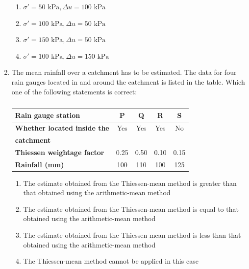 \documentclass[journal,12pt,onecolumn]{article}
\theoremstyle{remark}
\begin{document}
\begin{enumerate}
\hfill{}
\begin{enumerate}
    \item $\sigma' = 50 \text{ kPa}, \Delta u = 100 \text{ kPa}$
    \item $\sigma' = 100 \text{ kPa}, \Delta u = 50 \text{ kPa}$
    \item $\sigma' = 150 \text{ kPa}, \Delta u = 50 \text{ kPa}$
    \item $\sigma' = 100 \text{ kPa}, \Delta u = 150 \text{ kPa}$
\end{enumerate}

\item The mean rainfall over a catchment has to be estimated. The data for four rain gauges located in and around the catchment is listed in the table. Which one of the following statements is correct:
\begin{table}[H]
    \centering
    \begin{tabular}{|l|c|c|c|c|}
        \hline
        \textbf{Rain gauge station} & P & Q & R & S \\
        \hline
        \textbf{Whether located inside the} & Yes & Yes & Yes & No \\
        \textbf{catchment} & & & & \\
        \hline
        \textbf{Thiessen weightage factor} & 0.25 & 0.50 & 0.10 & 0.15 \\
        \hline
        \textbf{Rainfall (mm)} & 100 & 110 & 100 & 125 \\
        \hline
    \end{tabular}
    \caption{}
    \label{tab:q39}
\end{table}

\hfill{}
\begin{enumerate}
    \item The estimate obtained from the Thiessen-mean method is greater than that obtained using the arithmetic-mean method
    \item The estimate obtained from the Thiessen-mean method is equal to that obtained using the arithmetic-mean method
    \item The estimate obtained from the Thiessen-mean method is less than that obtained using the arithmetic-mean method
    \item The Thiessen-mean method cannot be applied in this case
\end{enumerate}


\end{enumerate}
\end{document}
